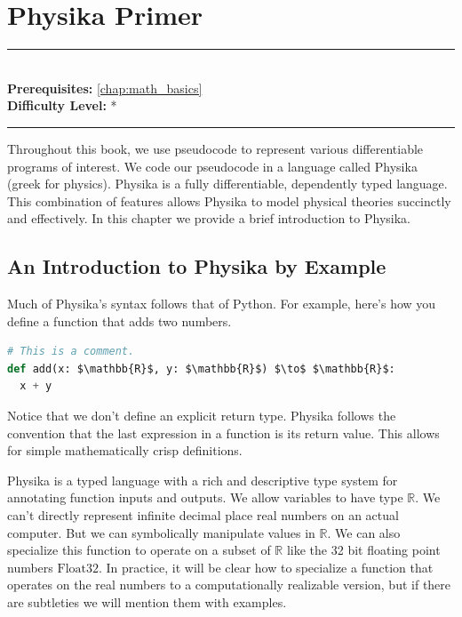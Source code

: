 \documentclass[book.tex]{subfiles}
\begin{document}
\chapter{Physika Primer}

\label{chap:physika}
\noindent\rule{11cm}{0.4pt} \\
\textbf{Prerequisites:}  \autoref{chap:math_basics}   \\
\textbf{Difficulty Level:} * \\
\noindent\rule{11cm}{0.4pt}
\vspace{5mm}


Throughout this book, we use pseudocode to represent various differentiable programs of interest. We code our pseudocode in a language called Physika (greek for physics). Physika is a fully differentiable, dependently typed language. This combination of features allows Physika to model physical theories succinctly and effectively. In this chapter we provide a brief introduction to Physika. 

\section{An Introduction to Physika by Example}
Much of Physika's syntax follows that of Python. For example, here's how you define a function that adds two numbers.

\begin{lstlisting}[language=python]
# This is a comment.
def add(x: $\mathbb{R}$, y: $\mathbb{R}$) $\to$ $\mathbb{R}$:
  x + y
\end{lstlisting}

Notice that we don't define an explicit return type. Physika follows the convention that the last expression in a function is its return value. This allows for simple mathematically crisp definitions.

Physika is a typed language with a rich and descriptive type system for annotating function inputs and outputs. We allow variables to have type $\mathbb{R}$. We can't directly represent infinite decimal place real numbers on an actual computer. But we can symbolically manipulate values in $\mathbb{R}$. We can also specialize this function to operate on a subset of $\mathbb{R}$ like the 32 bit floating point numbers $\textrm{Float32}$. In practice, it will be clear how to specialize a function that operates on the real numbers to a computationally realizable version, but if there are subtleties we will mention them with examples.
\end{document}
